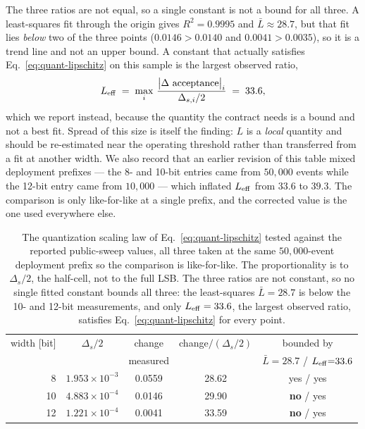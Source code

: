\documentclass[preprint,12pt]{elsarticle}
\begin{document}
The three ratios are not equal, so a single constant is not a bound for all
three.  A least-squares fit through the origin gives $R^2 = 0.9995$ and
$\bar L \approx 28.7$, but that fit lies \emph{below} two of the three points
($0.0146 > 0.0140$ and $0.0041 > 0.0035$), so it is a trend line and not an upper
bound.  A constant that actually satisfies Eq.~\eqref{eq:quant-lipschitz} on this
sample is the largest observed ratio,
\begin{equation}
 L_{\rm eff} \;=\; \max_{i}\,
 \frac{\bigl|\Delta\text{ acceptance}\bigr|_i}{\Delta_{s,i}/2} \;=\; 33.6 ,
 \label{eq:quant-leff}
\end{equation}
which we report instead, because the quantity the contract needs is a bound and
not a best fit.  Spread of this size is itself the finding: $L$ is a
\emph{local} quantity and should be re-estimated near the operating threshold
rather than transferred from a fit at another width.  We also record that an
earlier revision of this table mixed deployment prefixes --- the 8- and 10-bit
entries came from $50{,}000$ events while the 12-bit entry came from
$10{,}000$ --- which inflated $L_{\rm eff}$ from $33.6$ to $39.3$.  The
comparison is only like-for-like at a single prefix, and the corrected value is
the one used everywhere else.

\begin{table}[t]
\centering\small
\caption{The quantization scaling law of Eq.~\eqref{eq:quant-lipschitz} tested
against the reported public-sweep values, all three taken at the same
$50{,}000$-event deployment prefix so the comparison is like-for-like.  The
proportionality is to $\Delta_s/2$, the half-cell, not to the full LSB.  The
three ratios are not constant, so no single fitted constant bounds all three:
the least-squares $\bar L = 28.7$ is below the 10- and 12-bit measurements, and
only $L_{\rm eff} = 33.6$, the largest observed ratio, satisfies
Eq.~\eqref{eq:quant-lipschitz} for every point.}
\label{tab:quant-scaling}
\begin{tabular}{rcccc}
\toprule
width [bit] & $\Delta_s/2$ & change & change$/(\Delta_s/2)$ & bounded by \\
 & & measured & & $\bar L{=}28.7$ / $L_{\rm eff}{=}33.6$ \\
\midrule
8  & $1.953\times10^{-3}$ & 0.0559 & 28.62 & yes / yes \\
10 & $4.883\times10^{-4}$ & 0.0146 & 29.90 & \textbf{no} / yes \\
12 & $1.221\times10^{-4}$ & 0.0041 & 33.59 & \textbf{no} / yes \\
\bottomrule
\end{tabular}
\end{table}
\end{document}

